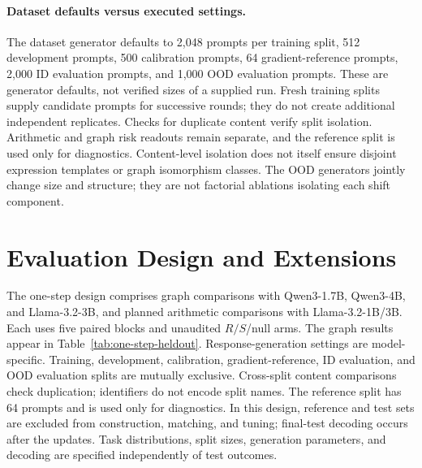 \paragraph{Dataset defaults versus executed settings.}
The dataset generator defaults to 2,048 prompts per training split,
512 development prompts, 500 calibration prompts, 64 gradient-reference
prompts, 2,000 ID evaluation prompts, and 1,000 OOD evaluation prompts.
These are generator defaults, not verified sizes of a supplied run.
Fresh training splits supply candidate prompts for successive rounds;
they do not create additional independent replicates. Checks for duplicate content verify split
isolation. Arithmetic and graph risk readouts remain
separate, and the reference split is used only for diagnostics. Content-level
isolation does not itself ensure disjoint expression templates or graph
isomorphism classes. The OOD generators jointly change size and structure;
they are not factorial ablations isolating each shift component.

\section{Evaluation Design and Extensions}
\label{app:evaluation}

The one-step design comprises graph comparisons with Qwen3-1.7B,
Qwen3-4B, and Llama-3.2-3B, and planned arithmetic comparisons with
Llama-3.2-1B/3B. Each uses five paired blocks and unaudited $R/S$/null
arms. The graph results appear in Table~\ref{tab:one-step-heldout}.
Response-generation settings are model-specific.
Training, development, calibration, gradient-reference, ID evaluation, and
OOD evaluation splits are mutually exclusive. Cross-split content comparisons check
duplication; identifiers do not encode split names. The reference split has
64 prompts and is used only for diagnostics. In this design, reference and
test sets are excluded from construction, matching, and tuning; final-test
decoding occurs after the updates. Task distributions, split sizes,
generation parameters, and decoding are specified independently of test outcomes.

